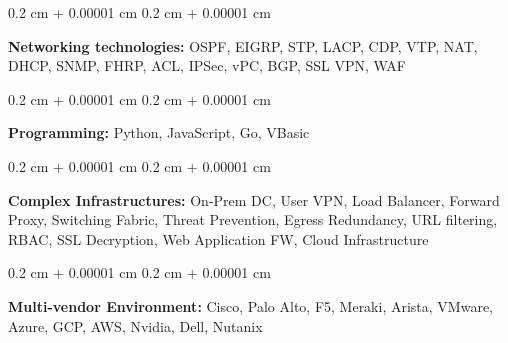 \documentclass[10pt, a4paper]{article}
\newenvironment{onecolentry}{
    \begin{adjustwidth}{
        0.2 cm + 0.00001 cm
    }{
        0.2 cm + 0.00001 cm
    }
}{
    \end{adjustwidth}
} %
\begin{document}
        \vspace{0.2 cm}

        \begin{onecolentry}
            \textbf{Networking technologies:} OSPF, EIGRP, STP, LACP, CDP, VTP, NAT, DHCP, SNMP, FHRP, ACL, IPSec, vPC, BGP, SSL VPN, WAF
        \end{onecolentry}

        \vspace{0.2 cm}

        \begin{onecolentry}
            \textbf{Programming:} Python, JavaScript, Go, VBasic
        \end{onecolentry}

        \vspace{0.2 cm}

        \begin{onecolentry}
            \textbf{Complex Infrastructures:} On-Prem DC, User VPN, Load Balancer, Forward Proxy, Switching Fabric, Threat Prevention, Egress Redundancy, URL filtering, RBAC, SSL Decryption, Web Application FW, Cloud Infrastructure
        \end{onecolentry}

        \vspace{0.2 cm}

        \begin{onecolentry}
            \textbf{Multi-vendor Environment:} Cisco, Palo Alto, F5, Meraki, Arista, VMware, Azure, GCP, AWS, Nvidia, Dell, Nutanix
        \end{onecolentry}


    
\end{document}
